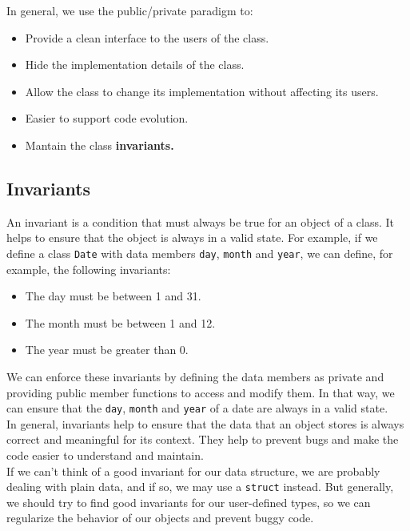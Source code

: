 In general, we use the public/private paradigm to:

\begin{itemize}
    \item Provide a clean interface to the users of the class.
    \item Hide the implementation details of the class.
    \item Allow the class to change its implementation without affecting its users.
    \item Easier to support code evolution.
    \item Mantain the class \textbf{invariants.}
\end{itemize}

\subsection{Invariants}

An invariant is a condition that must always be true for an object of a class.
It helps to ensure that the object is always in a valid state. For example, if we
define a class \texttt{Date} with data members \texttt{day}, \texttt{month} and
\texttt{year}, we can define, for example, the following invariants:

\begin{itemize}
    \item The day must be between 1 and 31.
    \item The month must be between 1 and 12.
    \item The year must be greater than 0.
\end{itemize}

We can enforce these invariants by defining the data members as private and
providing public member functions to access and modify them. In that way, we can
ensure that the \texttt{day}, \texttt{month} and \texttt{year} of a date are
always in a valid state.\\

In general, invariants help to ensure that the data that an object stores is always
correct and meaningful for its context. They help to prevent bugs and make the code 
easier to understand and maintain.\\

If we can't think of a good invariant for our data structure, we are probably dealing
with plain data, and if so, we may use a \texttt{struct} instead. But generally,
we should try to find good invariants for our user-defined types, so we can regularize
the behavior of our objects and prevent buggy code.

